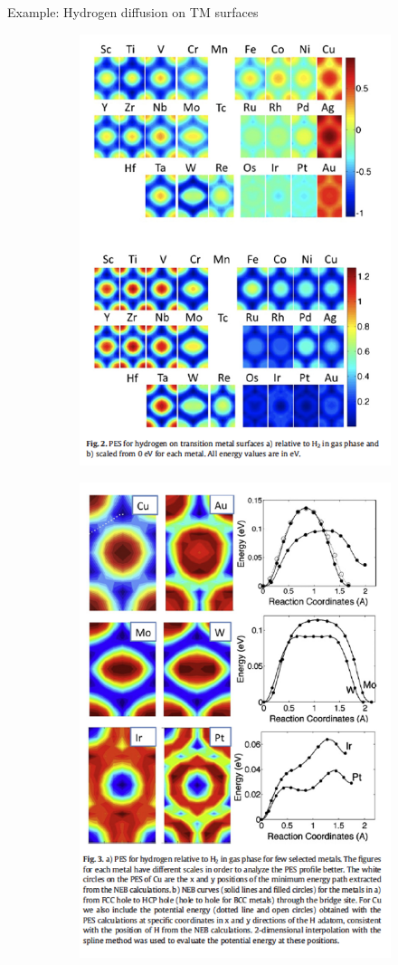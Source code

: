 \documentclass[aspectratio=169]{beamer}
\begin{document}
\begin{frame}{Example: Hydrogen diffusion on TM surfaces}
\begin{figure}
    \centering
    \begin{subfigure}{0.45\textwidth}
        \centering
        \includegraphics[width=0.65\linewidth]{lectures/figures/12-H_TM_1.png}
    \end{subfigure}
    \begin{subfigure}{0.45\textwidth}
        \centering
        \includegraphics[width=0.6\linewidth]{lectures/figures/12-H_TM_2.png}
    \end{subfigure}
    \caption{\cite{kristinsdottirSystematicDFTStudy2012}}
\end{figure} 
\end{frame} 
\end{document}
